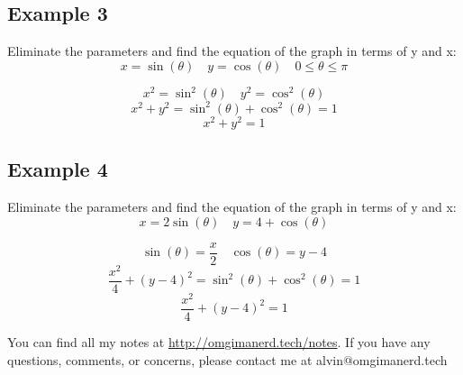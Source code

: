 \documentclass{math}
\begin{document}
\subsection*{Example 3}
Eliminate the parameters and find the equation of the graph in terms of y and x:
\[ x = \sin(\theta) \quad y = \cos(\theta) \quad 0 \leq \theta \leq \pi \]
\begin{center}
\end{center}
\[ x^{2} = \sin^{2}(\theta) \quad y^{2} = \cos^{2}(\theta) \]
\[ x^{2}+y^{2} = \sin^{2}(\theta)+\cos^{2}(\theta) = 1 \]
\[ x^{2}+y^{2} = 1 \]

\subsection*{Example 4}
Eliminate the parameters and find the equation of the graph in terms of y and x:
\[ x = 2\sin(\theta) \quad y = 4+\cos(\theta) \]
\begin{center}
\end{center}
\[ \sin(\theta) = \frac{x}{2} \quad \cos(\theta) = y-4 \]
\[ \frac{x^{2}}{4}+(y-4)^{2} = \sin^{2}(\theta)+\cos^{2}(\theta) = 1 \]
\[ \frac{x^{2}}{4}+(y-4)^{2} = 1 \]

\begin{center}
  You can find all my notes at \url{http://omgimanerd.tech/notes}. If you have
  any questions, comments, or concerns, please contact me at
  alvin@omgimanerd.tech
\end{center}
\end{document}
